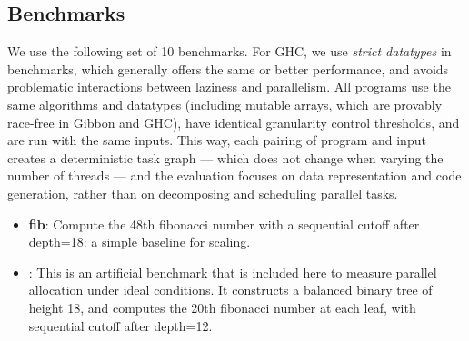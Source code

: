 \documentclass[acmsmall,acmthm=false,nonacm]{acmart}
\theoremstyle{straighttext0}
\theoremstyle{straighttext}
\newcommand{\new}[1]{#1}
\begin{document}
{%
\subsection{Benchmarks}
\label{subsec:benchmarks}

We use the following set of 10 benchmarks.
%
For GHC, we use {\em strict datatypes} in benchmarks, which generally offers the
same or better performance, and avoids problematic interactions between
laziness and parallelism.
%
All programs use the same algorithms and datatypes
(including mutable arrays, which are provably race-free in Gibbon and GHC),
have identical granularity control thresholds, and are run with the same inputs.
%
This way, each pairing of program and input creates a deterministic task graph ---
which does not change when varying the number of threads ---
and the evaluation focuses on data representation and code generation,
rather than on decomposing and scheduling parallel tasks.

\begin{itemize}

\item \textbf{fib}:
  Compute the 48th fibonacci number with a sequential cutoff after \new{depth=18}: a simple baseline for scaling.

\item \textbf{\buildfib{}}:
  This is an artificial benchmark that is included here to
  measure parallel allocation under ideal conditions.
  It constructs a balanced binary tree of height 18, and computes
  the 20th fibonacci number at each leaf, with sequential cutoff after depth=12.



\end{itemize}}
\end{document}
